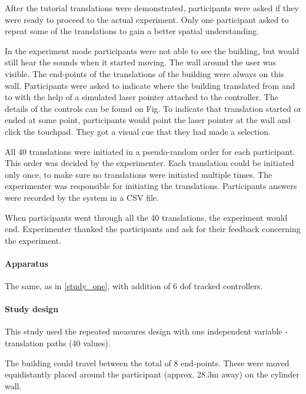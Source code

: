 After the tutorial translations were demonstrated, participants were asked if they were ready to proceed to the actual experiment. Only one participant asked to repeat some of the translations to gain a better spatial understanding.

In the experiment mode participants were not able to see the building, but would still hear the sounds when it started moving. The wall around the user was visible. The end-points of the translations of the building were always on this wall. Participants were asked to indicate where the building translated from and to with the help of a simulated laser pointer attached to the controller. The details of the controls can be found on Fig. %
To indicate that translation started or ended at some point, participants would point the laser pointer at the wall and click the touchpad. They got a visual cue that they had made a selection.

All 40 translations were initiated in a pseudo-random order for each participant. This order was decided by the experimenter. Each translation could be initiated only once, to make sure no translations were initiated multiple times. The experimenter was responsible for  initiating the translations. 
Participants answers were recorded by the system in a CSV file.

When participants went through all the 40 translations, the experiment would end. Experimenter thanked the participants and ask for their feedback concerning the experiment.

\paragraph{Apparatus} The same, as in \ref{study_one}, with addition of 6 \gls{dof} tracked controllers.

\paragraph{Study design}
This study used the repeated measures design with one independent variable - translation paths (40 values).

The building could travel between the total of 8 end-points. These were moved equidistantly placed around the participant (approx. 28.3m away) on the cylinder wall.

